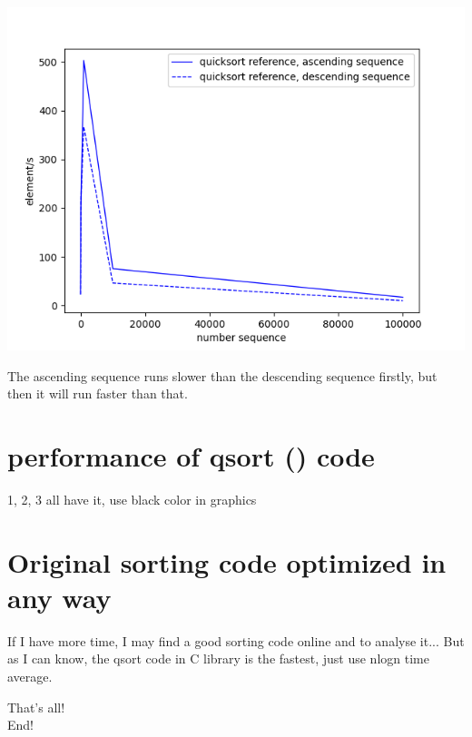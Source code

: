 \documentclass[12pt]{article}
\begin{document}
\includegraphics[scale=0.5]{3m1}

The ascending sequence runs slower than the descending sequence firstly, but then it will run faster than that.

\section{performance of qsort () code}

1, 2, 3 all have it, use black color in graphics


\section{Original sorting code optimized in any way}

If I have more time, I may find a good sorting code online and to analyse it...
But as I can know, the qsort code in C library is the fastest, just use nlogn time average.


\begin{center}
\Huge{That's all!} \\
\Huge{End!} \\
\end{center} 
\end{document}
